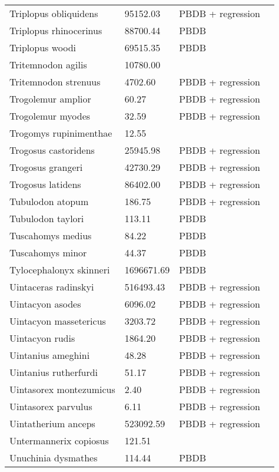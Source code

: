 \documentclass{article}
\begin{document}
\begin{center}
\begin{longtable}{p{} p{} p{} p{}}
    Triplopus obliquidens & 95152.03 & PBDB + regression &  \\ 
    Triplopus rhinocerinus & 88700.44 & PBDB &  \\ 
    Triplopus woodi & 69515.35 & PBDB &  \\ 
    Tritemnodon agilis & 10780.00 & \cite{Egi2001} &  \\ 
    Tritemnodon strenuus & 4702.60 & PBDB + regression &  \\ 
    Trogolemur amplior & 60.27 & PBDB + regression &  \\ 
    Trogolemur myodes & 32.59 & PBDB + regression &  \\ 
    Trogomys rupinimenthae & 12.55 & \cite{Tomiya2013} &  \\ 
    Trogosus castoridens & 25945.98 & PBDB + regression &  \\ 
    Trogosus grangeri & 42730.29 & PBDB + regression &  \\ 
    Trogosus latidens & 86402.00 & PBDB + regression &  \\ 
    Tubulodon atopum & 186.75 & PBDB + regression &  \\ 
    Tubulodon taylori & 113.11 & PBDB &  \\ 
    Tuscahomys medius & 84.22 & PBDB &  \\ 
    Tuscahomys minor & 44.37 & PBDB &  \\ 
    Tylocephalonyx skinneri & 1696671.69 & PBDB &  \\ 
    Uintaceras radinskyi & 516493.43 & PBDB + regression &  \\ 
    Uintacyon asodes & 6096.02 & PBDB + regression &  \\ 
    Uintacyon massetericus & 3203.72 & PBDB + regression &  \\ 
    Uintacyon rudis & 1864.20 & PBDB + regression &  \\ 
    Uintanius ameghini & 48.28 & PBDB + regression &  \\ 
    Uintanius rutherfurdi & 51.17 & PBDB + regression &  \\ 
    Uintasorex montezumicus & 2.40 & PBDB + regression &  \\ 
    Uintasorex parvulus & 6.11 & PBDB + regression &  \\ 
    Uintatherium anceps & 523092.59 & PBDB + regression &  \\ 
    Untermannerix copiosus & 121.51 & \cite{Tomiya2013} &  \\ 
    Unuchinia dysmathes & 114.44 & PBDB &  \\ 

\end{longtable}
\end{center}
\end{document}
